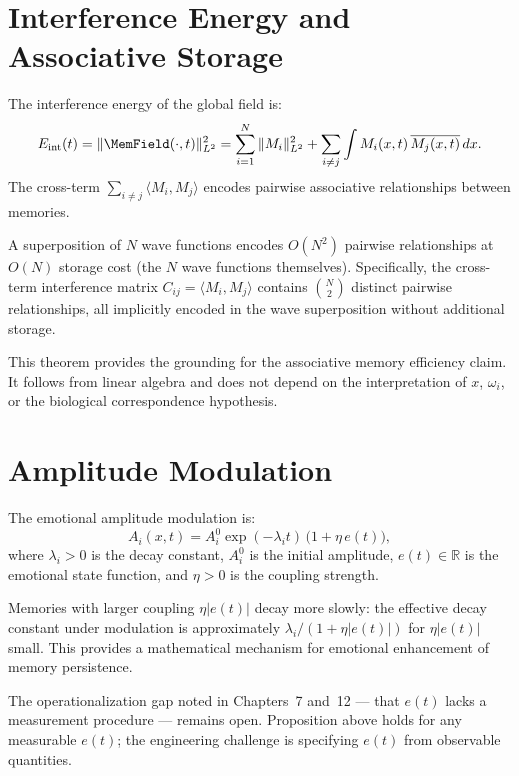 \section{Interference Energy and Associative Storage}
\label{app-d:interference}

The interference energy of the global field is:
\[
  E_{\mathrm{int}}(t) = \|\MemField(\cdot, t)\|_{L^2}^2
  = \sum_{i=1}^{N} \|M_i\|_{L^2}^2
  + \sum_{i \neq j} \int M_i(x,t)\,\overline{M_j(x,t)}\,dx.
\]
The cross-term $\sum_{i \neq j} \langle M_i, M_j \rangle$
encodes pairwise associative relationships between memories.

\begin{theorem}
\label{thm:associative-storage}
A superposition of $N$ wave functions encodes $O(N^2)$
pairwise relationships at $O(N)$ storage cost (the $N$
wave functions themselves). Specifically, the cross-term
interference matrix $C_{ij} = \langle M_i, M_j \rangle$
contains $\binom{N}{2}$ distinct pairwise relationships,
all implicitly encoded in the wave superposition without
additional storage.
\end{theorem}

This theorem provides the \LevelI{} grounding for
the associative memory efficiency claim. It follows
from linear algebra and does not depend on the
interpretation of $x$, $\omega_i$, or the biological
correspondence hypothesis.

\section{Amplitude Modulation}
\label{app-d:amplitude}

The emotional amplitude modulation is:
\[
  A_i(x,t) = A_i^0 \exp(-\lambda_i t)\,\bigl(1 + \eta\,e(t)\bigr),
\]
where $\lambda_i > 0$ is the decay constant, $A_i^0$
is the initial amplitude, $e(t) \in \mathbb{R}$ is the
emotional state function, and $\eta > 0$ is the coupling
strength.

\begin{proposition}
Memories with larger coupling $\eta |e(t)|$ decay
more slowly: the effective decay constant under modulation
is approximately $\lambda_i / (1 + \eta |e(t)|)$ for
$\eta |e(t)|$ small. This provides a mathematical
mechanism for emotional enhancement of memory persistence.
\end{proposition}

The operationalization gap noted in Chapters~7 and~12
--- that $e(t)$ lacks a measurement procedure --- remains
open. Proposition above holds for any measurable $e(t)$;
the engineering challenge is specifying $e(t)$ from
observable quantities.

